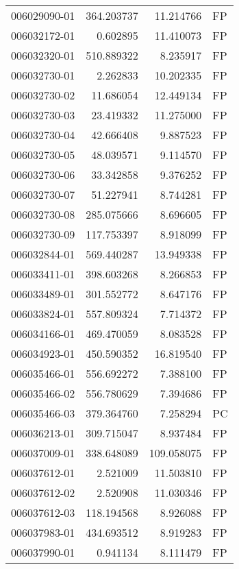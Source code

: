 \begin{tabular}{lrrl}
006029090-01 &  364.203737 &      11.214766 &   FP \\
006032172-01 &    0.602895 &      11.410073 &   FP \\
006032320-01 &  510.889322 &       8.235917 &   FP \\
006032730-01 &    2.262833 &      10.202335 &   FP \\
006032730-02 &   11.686054 &      12.449134 &   FP \\
006032730-03 &   23.419332 &      11.275000 &   FP \\
006032730-04 &   42.666408 &       9.887523 &   FP \\
006032730-05 &   48.039571 &       9.114570 &   FP \\
006032730-06 &   33.342858 &       9.376252 &   FP \\
006032730-07 &   51.227941 &       8.744281 &   FP \\
006032730-08 &  285.075666 &       8.696605 &   FP \\
006032730-09 &  117.753397 &       8.918099 &   FP \\
006032844-01 &  569.440287 &      13.949338 &   FP \\
006033411-01 &  398.603268 &       8.266853 &   FP \\
006033489-01 &  301.552772 &       8.647176 &   FP \\
006033824-01 &  557.809324 &       7.714372 &   FP \\
006034166-01 &  469.470059 &       8.083528 &   FP \\
006034923-01 &  450.590352 &      16.819540 &   FP \\
006035466-01 &  556.692272 &       7.388100 &   FP \\
006035466-02 &  556.780629 &       7.394686 &   FP \\
006035466-03 &  379.364760 &       7.258294 &   PC \\
006036213-01 &  309.715047 &       8.937484 &   FP \\
006037009-01 &  338.648089 &     109.058075 &   FP \\
006037612-01 &    2.521009 &      11.503810 &   FP \\
006037612-02 &    2.520908 &      11.030346 &   FP \\
006037612-03 &  118.194568 &       8.926088 &   FP \\
006037983-01 &  434.693512 &       8.919283 &   FP \\
006037990-01 &    0.941134 &       8.111479 &   FP \\

\end{tabular}
